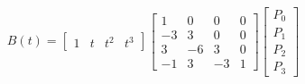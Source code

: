 \documentclass[preview]{standalone}
\begin{document}
\begin{align*}
B(t) = \begin{bmatrix} 1 & t & t^2 & t^3 \end{bmatrix} \begin{bmatrix} 1 & 0 & 0 & 0 \\ -3 & 3 & 0 & 0 \\ 3 & -6 & 3 & 0 \\ -1 & 3 & -3 & 1 \end{bmatrix} \begin{bmatrix} P_0 \\ P_1 \\ P_2 \\ P_3 \end{bmatrix}
\end{align*}
\end{document}
